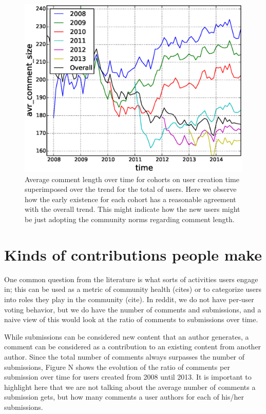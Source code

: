 \begin{figure}[!tb]
\centering
\includegraphics[scale=0.4]{./images/avr_comment_size_over_time_cohorts.eps}
\caption{Average comment length over time for cohorts on user creation time superimposed over the trend for the total of users. Here we observe how the early existence for each cohort has a reasonable agreement with the overall trend. This might indicate how the new users might be just adopting the community norms regarding comment length.}
\label{fig:fig_label}
\end{figure}

\section{Kinds of contributions people make}

One common question from the literature is what sorts of activities users engage in; this can be used as a metric of community health (cites) or to categorize users into roles they play in the community (cite).  In reddit, we do not have per-user voting behavior, but we do have the number of comments and submissions, and a naive view of this would look at the ratio of comments to submissions over time.

While submissions can be considered new content that an author generates, a comment can be considered as a contribution to an existing content from another author. Since the total number of comments always surpasses the number of submissions, Figure N shows the evolution of the ratio of comments per submission over time for users created from 2008 until 2013. It is important to highlight here that we are not talking about the average number of comments a submission gets, but how many comments a user authors for each of his/her submissions.


